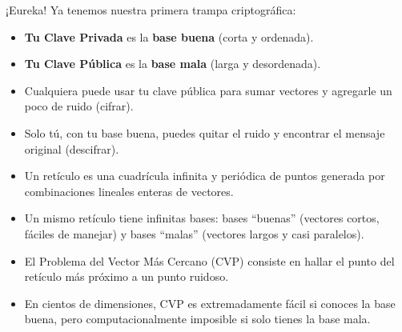 ¡Eureka! Ya tenemos nuestra primera trampa criptográfica:
\begin{itemize}
  \item \textbf{Tu Clave Privada} es la \textbf{base buena} (corta y ordenada).
  \item \textbf{Tu Clave Pública} es la \textbf{base mala} (larga y desordenada).
  \item Cualquiera puede usar tu clave pública para sumar vectores y agregarle un poco de ruido (cifrar).
  \item Solo tú, con tu base buena, puedes quitar el ruido y encontrar el mensaje original (descifrar).
\end{itemize}

\begin{resumencapitulo}
\begin{itemize}
  \item Un retículo es una cuadrícula infinita y periódica de puntos generada por combinaciones lineales enteras de vectores.
  \item Un mismo retículo tiene infinitas bases: bases ``buenas'' (vectores cortos, fáciles de manejar) y bases ``malas'' (vectores largos y casi paralelos).
  \item El Problema del Vector Más Cercano (CVP) consiste en hallar el punto del retículo más próximo a un punto ruidoso.
  \item En cientos de dimensiones, CVP es extremadamente fácil si conoces la base buena, pero computacionalmente imposible si solo tienes la base mala.
\end{itemize}
\end{resumencapitulo}

